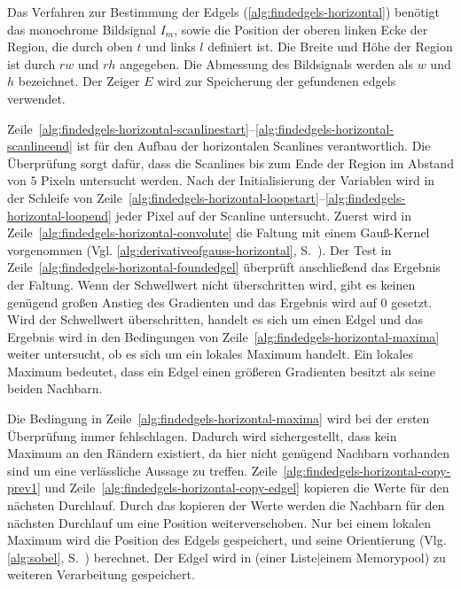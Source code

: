 Das Verfahren zur Bestimmung der Edgels (\autoref{alg:findedgels-horizontal}) benötigt das monochrome Bildsignal $I_m$,
 sowie die Position der oberen linken Ecke der Region, die durch oben $t$ und links $l$ definiert ist. Die Breite und
 Höhe der Region ist durch $\mathit{rw}$ und $\mathit{rh}$ angegeben. Die Abmessung des Bildsignals werden als $w$ und
 $h$ bezeichnet. Der Zeiger $E$ wird zur Speicherung der gefundenen \glspl{edgel} verwendet.



Zeile~\ref{alg:findedgels-horizontal-scanlinestart}--\ref{alg:findedgels-horizontal-scanlineend} ist für den Aufbau der
 horizontalen Scanlines verantwortlich. Die Überprüfung sorgt dafür, dass die Scanlines bis zum Ende der Region im
 Abstand von $5$ Pixeln untersucht werden. Nach der Initialisierung der Variablen wird in der Schleife von
 Zeile~\ref{alg:findedgels-horizontal-loopstart}--\ref{alg:findedgels-horizontal-loopend} jeder Pixel auf der Scanline
 untersucht. Zuerst wird in Zeile~\ref{alg:findedgels-horizontal-convolute} die Faltung mit einem Gauß-Kernel
 vorgenommen (Vgl. \autoref{alg:derivativeofgauss-horizontal}, S.~\pageref{alg:derivativeofgauss-horizontal}). Der Test
 in Zeile~\ref{alg:findedgels-horizontal-foundedgel} überprüft anschließend das Ergebnis der Faltung. Wenn der
 Schwellwert nicht überschritten wird, gibt es keinen genügend großen Anstieg des Gradienten und das Ergebnis wird auf
 $0$ gesetzt. Wird der Schwellwert überschritten, handelt es sich um einen Edgel und das Ergebnis wird in den
 Bedingungen von Zeile~\ref{alg:findedgels-horizontal-maxima} weiter untersucht, ob es sich um ein lokales Maximum
 handelt. Ein lokales Maximum bedeutet, dass ein Edgel einen größeren Gradienten besitzt als seine beiden Nachbarn.

Die Bedingung in Zeile~\ref{alg:findedgels-horizontal-maxima} wird bei der ersten Überprüfung immer fehlschlagen.
 Dadurch wird sichergestellt, dass kein Maximum an den Rändern existiert, da hier nicht genügend Nachbarn vorhanden sind
 um eine verlässliche Aussage zu treffen. Zeile~\ref{alg:findedgels-horizontal-copy-prev1} und
 Zeile~\ref{alg:findedgels-horizontal-copy-edgel} kopieren die Werte für den nächsten Durchlauf. Durch das kopieren der
 Werte werden die Nachbarn für den nächsten Durchlauf um eine Position weiterverschoben. Nur bei einem lokalen Maximum
 wird die Position des Edgels gespeichert, und seine Orientierung (Vlg. \autoref{alg:sobel},
 S.~\pageref{alg:sobel}) berechnet. Der Edgel wird in (einer Liste|einem Memorypool) zu weiteren Verarbeitung
 gespeichert.


